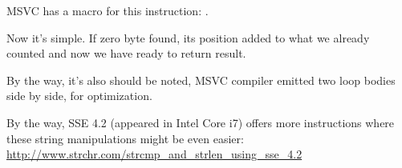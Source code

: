 {MSVC has a macro for this instruction:} .

{Now it's simple. If zero byte found, its position added to what we already counted and now we have 
ready to return result.}


{By the way, it's also should be noted, MSVC compiler emitted two loop bodies side by side, for optimization.}

{By the way, SSE 4.2 (appeared in Intel Core i7) offers more instructions where these string manipulations might be
even easier:} \url{http://www.strchr.com/strcmp\_and\_strlen\_using\_sse\_4.2}

